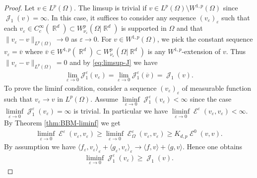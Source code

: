 \documentclass[12pt, reqno]{amsart}%
\theoremstyle{plain}  %
\theoremstyle{definition}  %
\numberwithin{equation}{section}
\DeclareMathOperator{\cE}{\mathcal{E}}
\DeclareMathOperator{\cJ}{\mathcal{J}}
\DeclareMathOperator{\R}{\mathbb{R}}
\newcommand{\eps}{\varepsilon}
\newcommand{\WnuOmRa}{W^p_{\nu_\eps}(\Omega|\R^d )}
\begin{document}
\begin{proof}
Let $v\in L^p(\Omega) $. The limsup is trivial if  $v\in L^p(\Omega)\setminus W^{1,p}(\Omega)$ since $\cJ_1(v)=\infty$. In this case, it suffices to consider any sequence $(v_\eps)_\eps$  such that each $ v_\eps \in C_c^\infty(\R^d)\subset \WnuOmRa$ is supported in $\Omega$ and  that $\|v_\eps-v \|_{L^p(\Omega)}\to 0$ as $\eps\to 0$. For  $v\in W^{1,p}(\Omega)$, we pick the constant sequence $v_\eps= \overline{v}$ where $\overline{v}\in W^{1,p}(\R^d)\subset \WnuOmRa$  is any $W^{1,p}$-extension of $v$. Thus $\|v_\eps-v \|_{L^p(\Omega)}= 0$ and by \eqref{eq:limsup-J} we have
%
\begin{align*}
\lim_{\eps\to0}\mathcal{J}^\eps_1(v_\eps)=\lim_{\eps\to0}\mathcal{J}^\eps_1(\overline{v})= \cJ_1(v).
\end{align*}
%
To prove the liminf condition, consider a sequence $(v_\eps)_\eps$ of measurable function such that $v_\eps\to v$ in $L^p(\Omega)$. Assume  $\liminf\limits_{\eps\to0}\cJ^\eps_1(v_\eps)<\infty$ since the case $\liminf\limits_{\eps\to0}\cJ^\eps_1(v_\eps)= \infty$ is trivial. In particular we have   $\liminf\limits_{\eps\to0}\cE^\eps(v_\eps,v_\eps)<\infty$.  By Theorem \ref{thm:BBM-liminf} we get
\begin{align*}
\liminf_{\eps\to0}\cE^\eps(v_\eps,v_\eps)
\geq
\liminf_{\eps\to0}\cE^\eps_\Omega(v_\eps,v_\eps)\geq K_{d,p}\cE^0(v,v).
\end{align*}
By  assumption we have $\langle f_\eps, v_\eps \rangle_\eps + \langle g_\eps,v_\eps\rangle_\eps
\to  \langle f, v\rangle+ \langle g, v\rangle$. Hence one obtains
\begin{align*}
\liminf_{\eps\to0}\cJ^\eps_1(v_\eps)\geq\cJ_1(v).
\end{align*}
\end{proof}
\end{document}
